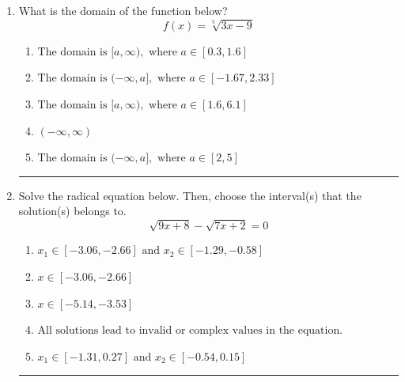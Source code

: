 \documentclass[14pt]{extbook}
\newcommand{\litem}[1]{\item#1\hspace*{-1cm}\rule{\textwidth}{0.4pt}}
\begin{document}
\begin{enumerate}
{\begin{enumerate}[label=\Alph*.]
\end{enumerate} }
\litem{
What is the domain of the function below?\[ f(x) = \sqrt[5]{3 x - 9} \]\begin{enumerate}[label=\Alph*.]
\item \( \text{The domain is } [a, \infty), \text{   where } a \in [0.3, 1.6] \)
\item \( \text{The domain is } (-\infty, a], \text{   where } a \in [-1.67, 2.33] \)
\item \( \text{The domain is } [a, \infty), \text{   where } a \in [1.6, 6.1] \)
\item \( (-\infty, \infty) \)
\item \( \text{The domain is } (-\infty, a], \text{   where } a \in [2, 5] \)

\end{enumerate} }
\litem{
Solve the radical equation below. Then, choose the interval(s) that the solution(s) belongs to.\[ \sqrt{9 x + 8} - \sqrt{7 x + 2} = 0 \]\begin{enumerate}[label=\Alph*.]
\item \( x_1 \in [-3.06, -2.66] \text{ and } x_2 \in [-1.29,-0.58] \)
\item \( x \in [-3.06,-2.66] \)
\item \( x \in [-5.14,-3.53] \)
\item \( \text{All solutions lead to invalid or complex values in the equation.} \)
\item \( x_1 \in [-1.31, 0.27] \text{ and } x_2 \in [-0.54,0.15] \)

\end{enumerate} }
\end{enumerate}
\end{document}
